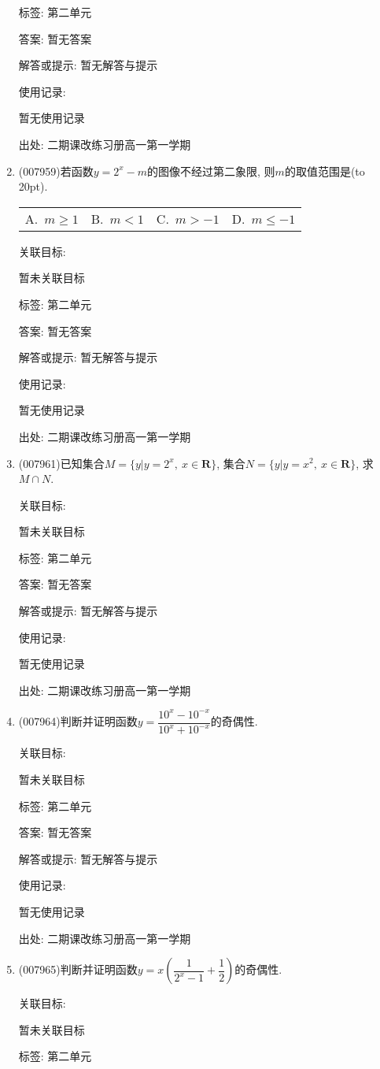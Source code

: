 \documentclass[10pt,a4paper]{article}
\newcommand{\bracket}[1]{(\hbox to #1pt{})}
\newcommand{\fourch}[4]{\par\begin{tabular}{p{.23\textwidth}p{.23\textwidth}p{.23\textwidth}p{.23\textwidth}}
A.~#1 &B.~#2& C.~#3& D.~#4
\end{tabular}}
\begin{document}
\begin{enumerate}[1.]
标签: 第二单元

答案: 暂无答案

解答或提示: 暂无解答与提示

使用记录:

暂无使用记录


出处: 二期课改练习册高一第一学期
\item { (007959)}若函数$y=2^x-m$的图像不经过第二象限, 则$m$的取值范围是\bracket{20}.
\fourch{$m\ge 1$}{$m<1$}{$m>-1$}{$m\le -1$}


关联目标:

暂未关联目标



标签: 第二单元

答案: 暂无答案

解答或提示: 暂无解答与提示

使用记录:

暂无使用记录


出处: 二期课改练习册高一第一学期
\item { (007961)}已知集合$M=\{y|y=2^x,\ x\in \mathbf{R}\}$, 集合$N=\{y|y=x^2,\ x\in \mathbf{R}\}$, 求$M\cap N$.


关联目标:

暂未关联目标



标签: 第二单元

答案: 暂无答案

解答或提示: 暂无解答与提示

使用记录:

暂无使用记录


出处: 二期课改练习册高一第一学期
\item { (007964)}判断并证明函数$y=\dfrac{10^x-10^{-x}}{10^x+10^{-x}}$的奇偶性.


关联目标:

暂未关联目标



标签: 第二单元

答案: 暂无答案

解答或提示: 暂无解答与提示

使用记录:

暂无使用记录


出处: 二期课改练习册高一第一学期
\item { (007965)}判断并证明函数$y=x(\dfrac 1{2^x-1}+\dfrac 12)$的奇偶性.


关联目标:

暂未关联目标



标签: 第二单元


\end{enumerate}
\end{document}
